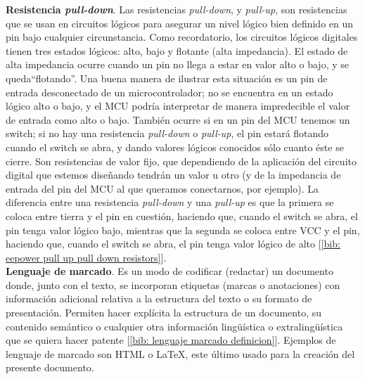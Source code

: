 \documentclass[12pt]{article}
\begin{document}
	\noindent \textbf{\large Resistencia \textit{pull-down}}. Las resistencias \textit{pull-down}, y \textit{pull-up}, son resistencias que se usan en circuitos lógicos para asegurar un nivel lógico bien definido en un pin bajo cualquier circunstancia. Como recordatorio, los circuitos lógicos digitales tienen tres estados lógicos: alto, bajo y flotante (alta impedancia). El estado de alta impedancia ocurre cuando un pin no llega a estar en valor alto o bajo, y se queda``flotando''. Una buena manera de ilustrar esta situación es un pin de entrada desconectado de un microcontrolador; no se encuentra en un estado lógico alto o bajo, y el MCU podría interpretar de manera impredecible el valor de entrada como alto o bajo. También ocurre si en un pin del MCU tenemos un switch; si no hay una resistencia \textit{pull-down} o \textit{pull-up}, el pin estará flotando cuando el switch se abra, y dando valores lógicos conocidos sólo cuanto éste se cierre. Son resistencias de valor fijo, que dependiendo de la aplicación del circuito digital que estemos diseñando tendrán un valor u otro (y de la impedancia de entrada del pin del MCU al que queramos conectarnos, por ejemplo). La diferencia entre una resistencia \textit{pull-down} y una \textit{pull-up} es que la primera se coloca entre tierra y el pin en cuestión, haciendo que, cuando el switch se abra, el pin tenga valor lógico bajo, mientras que la segunda se coloca entre VCC y el pin, haciendo que, cuando el switch se abra, el pin tenga valor lógico de alto [\ref{bib: eepower pull up pull down resistors}].\\ 
	
	\noindent \textbf{\large Lenguaje de marcado}. Es un modo de codificar (redactar) un documento donde, junto con el texto, se incorporan etiquetas (marcas o anotaciones) con información adicional relativa a la estructura del texto o su formato de presentación. Permiten hacer explícita la estructura de un documento, su contenido semántico o cualquier otra información lingüística o extralingüística que se quiera hacer patente [\ref{bib: lenguaje marcado definicion}]. Ejemplos de lenguaje de marcado son HTML o LaTeX, este último usado para la creación del presente documento. \\
	
\end{document}

